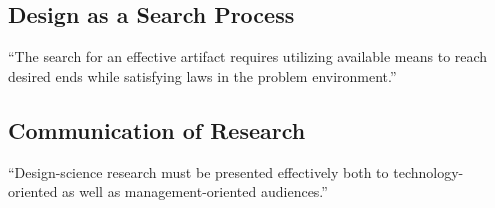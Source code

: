 \subsection{Design as a Search Process}
``The search for an effective artifact requires utilizing available means to reach desired ends while satisfying laws in the problem environment.'' 

\subsection{Communication of Research}
``Design-science research must be presented effectively both to technology-oriented as well as management-oriented audiences.'' 
